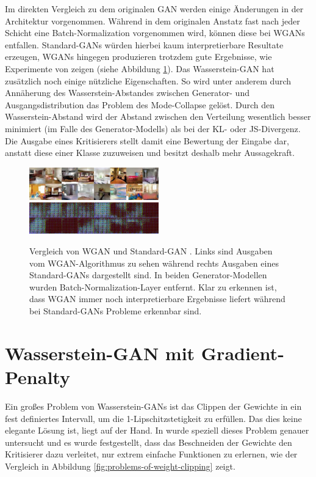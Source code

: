 \documentclass{hsflensburg}
\begin{document}
  Im direkten Vergleich zu dem originalen GAN \cite{goodfellow2014generative}
  werden einige Änderungen in der Architektur vorgenommen. Während in dem
  originalen Anstatz fast nach jeder Schicht eine Batch-Normalization
  vorgenommen wird, können diese bei WGANs entfallen. Standard-GANs würden
  hierbei kaum interpretierbare Resultate erzeugen, WGANs hingegen produzieren
  trotzdem gute Ergebnisse, wie Experimente von \cite{arjovsky2017wasserstein}
  zeigen (siehe Abbildung \ref{fig:wgan-gan-no-batchnorm}). Das Wasserstein-GAN
  hat zusätzlich noch einige nützliche Eigenschaften. So wird unter anderem
  durch Annäherung des Wasserstein-Abstandes zwischen Generator- und
  Ausgangsdistribution das Problem des Mode-Collapse gelöst.  Durch den
  Wasserstein-Abstand wird der Abstand zwischen den Verteilung wesentlich besser
  minimiert (im Falle des Generator-Modells) als bei der KL- oder JS-Divergenz.
  Die Ausgabe eines Kritisierers stellt damit eine Bewertung der Eingabe dar,
  anstatt diese einer Klasse zuzuweisen und besitzt deshalb mehr Aussagekraft.

  \begin{figure}
    \includegraphics[width=0.5\textwidth]{images/image-022.png}
    \includegraphics[width=0.5\textwidth]{images/image-024.png}
    \caption{Vergleich von WGAN und Standard-GAN \cite{arjovsky2017wasserstein}.
      Links sind Ausgaben vom WGAN-Algorithmus zu sehen während rechts Ausgaben
      eines Standard-GANs dargestellt sind. In beiden Generator-Modellen wurden
      Batch-Normalization-Layer entfernt. Klar zu erkennen ist, dass WGAN immer
      noch interpretierbare Ergebnisse liefert während bei Standard-GANs Probleme
      erkennbar sind.}
    \label{fig:wgan-gan-no-batchnorm}
  \end{figure}

  \section{Wasserstein-GAN mit Gradient-Penalty}
  Ein großes Problem von Wasserstein-GANs ist das Clippen der Gewichte in ein
  fest definiertes Intervall, um die 1-Lipschitzstetigkeit zu erfüllen. Das dies
  keine elegante Lösung ist, liegt auf der Hand. In \cite{gulrajani2017improved}
  wurde speziell dieses Problem genauer untersucht und es wurde festgestellt,
  dass das Beschneiden der Gewichte den Kritisierer dazu verleitet, nur extrem
  einfache Funktionen zu erlernen, wie der Vergleich in Abbildung
  \ref{fig:problems-of-weight-clipping} zeigt. 
\end{document}
